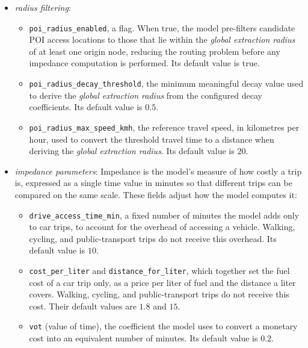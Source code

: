 \documentclass{article}
\begin{document}
\begin{itemize}
    \item \emph{radius filtering}:
    \begin{itemize}
        \item \texttt{poi\_radius\_enabled}, a flag. When true, the
        model pre-filters candidate POI access locations to those that lie
        within the \emph{global extraction radius} of at least one origin node,
        reducing the routing problem before any impedance computation is performed.
        Its default value is true.
        \item \texttt{poi\_radius\_decay\_threshold}, the minimum meaningful decay
        value used to derive the \emph{global extraction radius} from the configured
        decay coefficients. Its default value is \(0.5\).
        \item \texttt{poi\_radius\_max\_speed\_kmh}, the reference travel speed, in
        kilometres per hour, used to convert the threshold travel time to a distance
        when deriving the \emph{global extraction radius}. Its default value is
        \(20\).
    \end{itemize}

    \item \emph{impedance parameters}: Impedance is the model's measure of how costly a trip is, expressed as a single time value in minutes so that different trips can be compared on the same scale. These fields adjust how the model computes it:
    \begin{itemize}
        \item \texttt{drive\_access\_time\_min}, a fixed number of minutes the model adds only to car trips, to account for the overhead of accessing a vehicle. Walking, cycling, and public-transport trips do not receive this overhead. Its default value is \(10\).
        \item \texttt{cost\_per\_liter} and \texttt{distance\_for\_liter}, which together set the fuel cost of a car trip only, as a price per liter of fuel and the distance a liter covers. Walking, cycling, and public-transport trips do not receive this cost. Their default values are \(1.8\) and \(15\).
        \item \texttt{vot} (value of time), the coefficient the model uses to convert a monetary cost into an equivalent number of minutes. Its default value is \(0.2\).
    \end{itemize}



\end{itemize}
\end{document}
